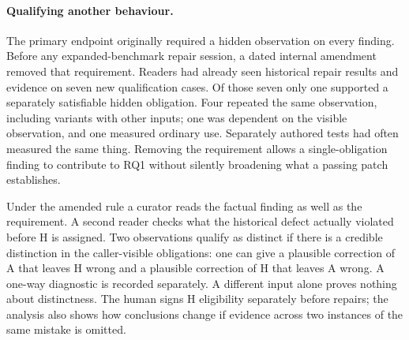 \paragraph{Qualifying another behaviour.}
The primary endpoint originally required a hidden observation on every finding. Before any expanded-benchmark repair session, a dated internal amendment removed that requirement. Readers had already seen historical repair results and evidence on seven new qualification cases. Of those seven only one supported a separately satisfiable hidden obligation. Four repeated the same observation, including variants with other inputs; one was dependent on the visible observation, and one measured ordinary use. Separately authored tests had often measured the same thing. Removing the requirement allows a single-obligation finding to contribute to RQ1 without silently broadening what a passing patch establishes.

Under the amended rule a curator reads the factual finding as well as the requirement. A second reader checks what the historical defect actually violated before H is assigned. Two observations qualify as distinct if there is a credible distinction in the caller-visible obligations: one can give a plausible correction of A that leaves H wrong and a plausible correction of H that leaves A wrong. A one-way diagnostic is recorded separately. A different input alone proves nothing about distinctness. The human signs H eligibility separately before repairs; the analysis also shows how conclusions change if evidence across two instances of the same mistake is omitted.
